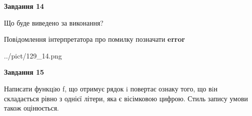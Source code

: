 \documentclass[11pt, ukrainian]{article}
\begin{document}
{\begin {large}
{\begin {center}\textbf{Завдання 14}\end {center}}\par
Що буде виведено за виконання? \par
Повідомлення інтерпретатора про помилку позначати \textbf{error}

\begin{center}
	{../pict/129_14.png}
\end{center}
\newpage

{\begin {center}\textbf{Завдання 15}\end {center}}\par

Написати функцiю f, що отримує рядок i повертає ознаку того, що вiн складається рівно з однієї літери, яка є вісімковою цифрою. Стиль запису умови також оцінюється.\par
\newpage

\end {large}}
\end{document}
